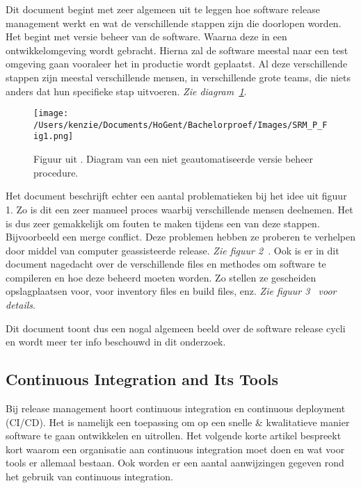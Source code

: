 Dit document \autocite{Barshefsky2005} begint met zeer algemeen uit te leggen hoe software release management werkt en wat de verschillende stappen zijn die doorlopen worden. Het begint met versie beheer van de software. Waarna deze in een ontwikkelomgeving wordt gebracht. Hierna zal de software meestal naar een test omgeving gaan vooraleer het in productie wordt geplaatst. Al deze verschillende stappen zijn meestal verschillende mensen, in verschillende grote teams, die niets anders dat hun specifieke stap uitvoeren. \emph{Zie diagram~\ref{fig:FL_fig1}}.
\begin{figure}[!htbp]
    \centering
    \texttt{[image: /Users/kenzie/Documents/HoGent/Bachelorproef/Images/SRM\_P\_Fig1.png]}
    \caption{Figuur uit \autocite{Barshefsky2005}. Diagram van een niet geautomatiseerde versie beheer procedure.}
    \label{fig:FL_fig1}
\end{figure}
Het document \autocite{Barshefsky2005} beschrijft echter een aantal problematieken bij het idee uit figuur 1. Zo is dit een zeer manueel proces waarbij verschillende mensen deelnemen. Het is dus zeer gemakkelijk om fouten te maken tijdens een van deze stappen. Bijvoorbeeld een merge conflict. Deze problemen hebben ze proberen te verhelpen door middel van computer geassisteerde release. \emph{Zie figuur 2~\textcite{Barshefsky2005}}. Ook is er in dit document nagedacht over de verschillende files en methodes om software te compileren en hoe deze beheerd moeten worden. Zo stellen ze gescheiden opslagplaatsen voor, voor inventory files en build files, enz. \emph{Zie figuur 3~\textcite{Barshefsky2005} voor details}.

Dit document \autocite{Barshefsky2005} toont dus een nogal algemeen beeld over de software release cycli en wordt meer ter info beschouwd in dit onderzoek.

\subsection{Continuous Integration and Its Tools}
Bij release management hoort continuous integration en continuous deployment (CI/CD). Het is namelijk een toepassing om op een snelle \& kwalitatieve manier software te gaan ontwikkelen en uitrollen. Het volgende korte artikel \autocite{Meyer2014} bespreekt kort waarom een organisatie aan continuous integration moet doen en wat voor tools er allemaal bestaan. Ook worden er een aantal aanwijzingen gegeven rond het gebruik van continuous integration.

